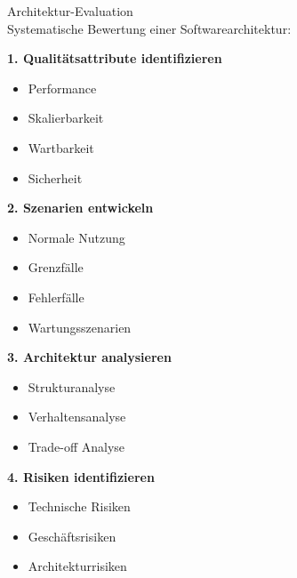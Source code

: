 \begin{KR}{Architektur-Evaluation}\\
Systematische Bewertung einer Softwarearchitektur:

\textbf{1. Qualitätsattribute identifizieren}
\begin{itemize}
    \item Performance
    \item Skalierbarkeit
    \item Wartbarkeit
    \item Sicherheit
\end{itemize}

\textbf{2. Szenarien entwickeln}
\begin{itemize}
    \item Normale Nutzung
    \item Grenzfälle
    \item Fehlerfälle
    \item Wartungsszenarien
\end{itemize}

\textbf{3. Architektur analysieren}
\begin{itemize}
    \item Strukturanalyse
    \item Verhaltensanalyse
    \item Trade-off Analyse
\end{itemize}

\textbf{4. Risiken identifizieren}
\begin{itemize}
    \item Technische Risiken
    \item Geschäftsrisiken
    \item Architekturrisiken
\end{itemize}
\end{KR}

